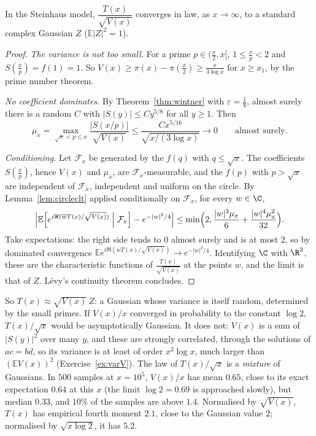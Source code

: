 \begin{theorem}\label{thm:condclt}
In the Steinhaus model, $\dfrac{T(x)}{\sqrt{V(x)}}$ converges in law, as $x\to\infty$, to a standard complex Gaussian $Z$ ($\mathbb E|Z|^2=1$).
\end{theorem}
\begin{proof}
\emph{The variance is not too small.} For a prime $p\in(\frac x2,x]$, $1\le\frac xp<2$ and $S(\frac xp)=f(1)=1$. So $V(x)\ge\pi(x)-\pi(\frac x2)\ge\frac x{3\log x}$ for $x\ge x_1$, by the prime number theorem.

\emph{No coefficient dominates.} By Theorem~\ref{thm:wintner} with $\varepsilon=\frac18$, almost surely there is a random $C$ with $|S(y)|\le Cy^{5/8}$ for all $y\ge1$. Then
\[
\mu_x=\max_{\sqrt x<p\le x}\frac{|S(x/p)|}{\sqrt{V(x)}}\le\frac{Cx^{5/16}}{\sqrt{x/(3\log x)}}\longrightarrow0\qquad\text{almost surely.}
\]

\emph{Conditioning.} Let $\mathcal F_x$ be generated by the $f(q)$ with $q\le\sqrt x$. The coefficients $S(\frac xp)$, hence $V(x)$ and $\mu_x$, are $\mathcal F_x$-measurable, and the $f(p)$ with $p>\sqrt x$ are independent of $\mathcal F_x$, independent and uniform on the circle. By Lemma~\ref{lem:circleclt} applied conditionally on $\mathcal F_x$, for every $w\in\C$,
\[
\Bigl|\mathbb E\Bigl[e^{i\Re(\overline wT(x)/\sqrt{V(x)})}\Bigm|\mathcal F_x\Bigr]-e^{-|w|^2/4}\Bigr|\le\min\Bigl(2,\frac{|w|^3\mu_x}6+\frac{|w|^4\mu_x^2}{32}\Bigr).
\]
Take expectations: the right side tends to $0$ almost surely and is at most $2$, so by dominated convergence $\mathbb Ee^{i\Re(\overline wT(x)/\sqrt{V(x)})}\to e^{-|w|^2/4}$. Identifying $\C$ with $\R^2$, these are the characteristic functions of $\frac{T(x)}{\sqrt{V(x)}}$ at the points $w$, and the limit is that of $Z$. Lévy's continuity theorem concludes.
\end{proof}

So $T(x)\approx\sqrt{V(x)}\,Z$: a Gaussian whose variance is itself random, determined by the small primes. If $V(x)/x$ converged in probability to the constant $\log2$, $T(x)/\sqrt x$ would be asymptotically Gaussian. It does not: $V(x)$ is a sum of $|S(y)|^2$ over many $y$, and these are strongly correlated, through the solutions of $ac=bd$, so its variance is at least of order $x^2\log x$, much larger than $(\mathbb EV(x))^2$ (Exercise~\ref{ex:varV}). The law of $T(x)/\sqrt x$ is a \emph{mixture} of Gaussians. In $500$ samples at $x=10^5$, $V(x)/x$ has mean $0.65$, close to its exact expectation $0.64$ at this $x$ (the limit $\log2=0.69$ is approached slowly), but median $0.33$, and $10\%$ of the samples are above $1.4$. Normalised by $\sqrt{V(x)}$, $T(x)$ has empirical fourth moment $2.1$, close to the Gaussian value $2$; normalised by $\sqrt{x\log2}$, it has $5.2$.

